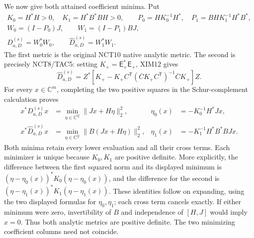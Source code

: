 We now give both attained coefficient minima. Put
\[
\begin{gathered}
 K_0=H^*H>0,\quad K_1=H^*B^*BH>0,\qquad
 P_0=HK_0^{-1}H^*,\quad P_1=BHK_1^{-1}H^*B^*,\\
 W_0=(I-P_0)J,\qquad W_1=(I-P_1)BJ,\\
 D_{a,D}^{(s)}=W_0^*W_0,\qquad
 \widehat D_{a,D}^{(s)}=W_1^*W_1.
\end{gathered}\tag{XIM14}
\]
The first metric is the original NCT10 native analytic metric. The
second is precisely NCT8/TAC5: setting $K_+=\mathsf E_+^*\mathsf E_+$,
XIM12 gives
\[
 \widehat D_{a,D}^{(s)}=
 Z^*\left[K_+-K_+C^{\mathsf T}
    (\overline C K_+ C^{\mathsf T})^{-1}\overline C K_+\right]Z.
 \tag{XIM15}
\]
For every $x\in\mathbb C^m$, completing the two positive squares
in the Schur-complement calculation
\cite[Appendix A.5.5, p.~650; Appendix C.4.1, p.~673]{human:boyd-vandenberghe}
proves
\[
\begin{aligned}
 x^*D_{a,D}^{(s)}x
   &=\min_{\eta\in\mathbb C^Q}\|Jx+H\eta\|_2^2,
 &\eta_0(x)&=-K_0^{-1}H^*Jx,\\
 x^*\widehat D_{a,D}^{(s)}x
   &=\min_{\eta\in\mathbb C^Q}\|B(Jx+H\eta)\|_2^2,
 &\eta_1(x)&=-K_1^{-1}H^*B^*BJx.
\end{aligned}\tag{XIM16}
\]
Both minima retain every lower evaluation and all their cross terms.
Each minimizer is unique because $K_0,K_1$ are positive definite.
More explicitly, the difference between the first squared norm and
its displayed minimum is
$(\eta-\eta_0(x))^*K_0(\eta-\eta_0(x))$, and the difference for
the second is $(\eta-\eta_1(x))^*K_1(\eta-\eta_1(x))$.
These identities follow on expanding, using the two displayed
formulas for $\eta_0,\eta_1$; each cross term cancels exactly.
If either minimum were zero, invertibility of $B$ and independence
of $[H,J]$ would imply $x=0$. Thus both analytic metrics are positive
definite. The two minimizing coefficient columns need not coincide.


